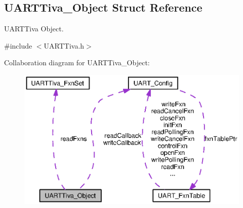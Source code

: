 \subsection{U\+A\+R\+T\+Tiva\+\_\+\+Object Struct Reference}
\label{struct_u_a_r_t_tiva___object}


U\+A\+R\+T\+Tiva Object.  




{\ttfamily \#include $<$U\+A\+R\+T\+Tiva.\+h$>$}



Collaboration diagram for U\+A\+R\+T\+Tiva\+\_\+\+Object\+:
\nopagebreak
\begin{figure}[H]
\begin{center}
\leavevmode
\includegraphics[width=350pt]{struct_u_a_r_t_tiva___object__coll__graph}
\end{center}
\end{figure}
